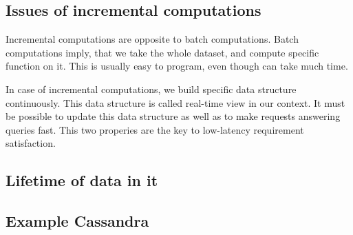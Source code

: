 \subsection{Issues of incremental computations}
Incremental computations are opposite to batch computations.
Batch computations imply, that we take the whole dataset, and compute
specific function on it.
This is usually easy to program, even though can take much time.

In case of incremental computations, we build specific data structure
continuously.
This data structure is called real-time view in our context.
It must be possible to update this data structure as well as to make requests
answering queries fast.
This two properies are the key to low-latency requirement satisfaction.

\subsection{Lifetime of data in it}
\subsection{Example Cassandra} 

